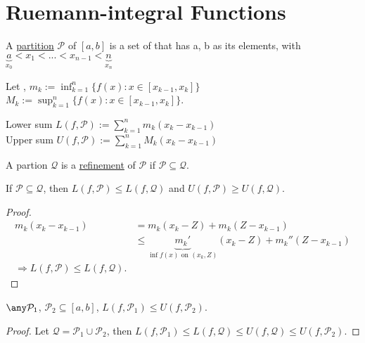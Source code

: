 \section{Ruemann-integral Functions}
\begin{definition}
    A \uline{partition} $\mathcal{P}$ of $[a,b]$ is a  set of  that has a, b as its elements, with \\
    $\underbrace{a}_{x_0} < x_1 < ... < x_{n-1} < \underbrace{n}_{x_n}$
\end{definition}
Let , $m_k := \inf^n_{k=1} \{ f(x) : x \in [x_{k-1}, x_k]\}$ \\
\indent \indent \indent \indent\indent \indent  \indent \indent \quad $M_k := \sup^n_{k=1} \{ f(x): x \in [x_{k-1}, x_k]\}$.\\
\begin{definition}
    Lower sum $L (f, \mathcal{P}) := \sum^n_{k=1} m_k (x_k - x_{k-1})$ \\
    \indent \indent \quad Upper sum $U(f, \mathcal{P}) := \sum^n_{k=1} M_k (x_k - x_{k-1})$
\end{definition}
\begin{definition}
    A partion $\mathcal{Q}$ is a \uline{refinement} of $\mathcal{P}$ if $\mathcal{P} \subseteq \mathcal{Q}$.
\end{definition}
\begin{lemma}
    If $\mathcal{P} \subseteq \mathcal{Q}$, then $L(f, \mathcal{P}) \leq L(f,\mathcal{Q})$ and $U(f,\mathcal{P}) \geq U(f,\mathcal{Q})$.
\end{lemma}
\begin{proof}
\begin{align*}
    m_k (x_k - x_{k-1}) &= m_k (x_k - Z) + m_k (Z - x_{k-1}) \\
    &\leq \underbrace{m_k'}_{\inf f(x) \text{ on }(x_k, Z)} (x_k - Z) + m_k'' (Z - x_{k-1}) \\
    \Rightarrow L(f, \mathcal{P}) \leq L(f, \mathcal{Q}).
    \end{align*}
\end{proof}
\begin{lemma}
    $\any \mathcal{P}_1$, $\mathcal{P}_2 \subseteq [a,b]$, $L(f,\mathcal{P}_1) \leq U (f, \mathcal{P}_2)$.
\end{lemma}
\begin{proof}
    Let $\mathcal{Q}=\mathcal{P}_1 \cup \mathcal{P}_2$, then $L(f, \mathcal{P}_1) \leq L(f, \mathcal{Q}) \leq U(f, \mathcal{Q}) \leq U(f, \mathcal{P}_2). $
\end{proof}
